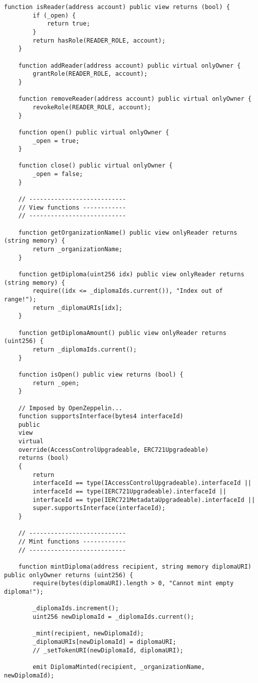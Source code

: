 \begin{lstlisting}[caption=Код смарт-контракта учебного заведения, label = list3, style=realcode]
	function isReader(address account) public view returns (bool) {
		if (_open) {
			return true;
		}
		return hasRole(READER_ROLE, account);
	}
	
	function addReader(address account) public virtual onlyOwner {
		grantRole(READER_ROLE, account);
	}
	
	function removeReader(address account) public virtual onlyOwner {
		revokeRole(READER_ROLE, account);
	}
	
	function open() public virtual onlyOwner {
		_open = true;
	}
	
	function close() public virtual onlyOwner {
		_open = false;
	}
	
	// ---------------------------
	// View functions ------------
	// ---------------------------
	
	function getOrganizationName() public view onlyReader returns (string memory) {
		return _organizationName;
	}
	
	function getDiploma(uint256 idx) public view onlyReader returns (string memory) {
		require((idx <= _diplomaIds.current()), "Index out of range!");
		return _diplomaURIs[idx];
	}
	
	function getDiplomaAmount() public view onlyReader returns (uint256) {
		return _diplomaIds.current();
	}
	
	function isOpen() public view returns (bool) {
		return _open;
	}
	
	// Imposed by OpenZeppelin...
	function supportsInterface(bytes4 interfaceId)
	public
	view
	virtual
	override(AccessControlUpgradeable, ERC721Upgradeable)
	returns (bool)
	{
		return
		interfaceId == type(IAccessControlUpgradeable).interfaceId ||
		interfaceId == type(IERC721Upgradeable).interfaceId ||
		interfaceId == type(IERC721MetadataUpgradeable).interfaceId ||
		super.supportsInterface(interfaceId);
	}
	
	// ---------------------------
	// Mint functions ------------
	// ---------------------------
	
	function mintDiploma(address recipient, string memory diplomaURI) public onlyOwner returns (uint256) {
		require(bytes(diplomaURI).length > 0, "Cannot mint empty diploma!");
		
		_diplomaIds.increment();
		uint256 newDiplomaId = _diplomaIds.current();
		
		_mint(recipient, newDiplomaId);
		_diplomaURIs[newDiplomaId] = diplomaURI;
		// _setTokenURI(newDiplomaId, diplomaURI);
		
		emit DiplomaMinted(recipient, _organizationName, newDiplomaId);
		

\end{lstlisting}
